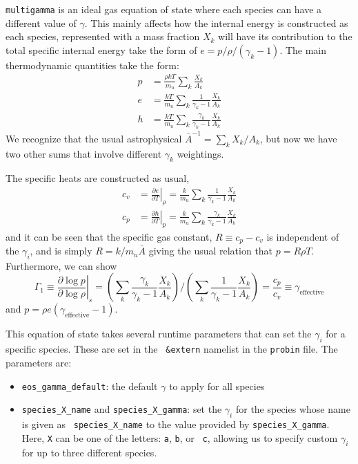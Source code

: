 {\tt multigamma} is an ideal gas equation of state where each
  species can have a different value of $\gamma$.  This mainly affects
  how the internal energy is constructed as each species, represented
  with a mass fraction $X_k$ will have its contribution to the total
  specific internal energy take the form of $e = p/\rho/(\gamma_k -
  1)$.  The main thermodynamic quantities take the form:
\begin{align}
p &= \frac{\rho k T}{m_u} \sum_k \frac{X_k}{A_k} \\
e &= \frac{k T}{m_u} \sum_k \frac{1}{\gamma_k - 1} \frac{X_k}{A_k} \\
h &= \frac{k T}{m_u} \sum_k \frac{\gamma_k}{\gamma_k - 1} \frac{X_k}{A_k}
\end{align}
We recognize that the usual astrophysical $\bar{A}^{-1} = \sum_k
X_k/A_k$, but now we have two other sums that involve different
$\gamma_k$ weightings.

The specific heats are constructed as usual,
\begin{align}
c_v &= \left . \frac{\partial e}{\partial T} \right |_\rho = 
    \frac{k}{m_u} \sum_k \frac{1}{\gamma_k - 1} \frac{X_k}{A_k} \\
c_p &= \left . \frac{\partial h}{\partial T} \right |_p = 
    \frac{k}{m_u} \sum_k \frac{\gamma_k}{\gamma_k - 1} \frac{X_k}{A_k} 
\end{align}
and it can be seen that the specific gas constant, $R \equiv c_p -
c_v$ is independent of the $\gamma_i$, and is simply $R =
k/m_u\bar{A}$ giving the usual relation that $p = R\rho T$.
Furthermore, we can show
\begin{equation}
\Gamma_1 \equiv \left . \frac{\partial \log p}{\partial \log \rho} \right |_s =  
   \left ( \sum_k \frac{\gamma_k}{\gamma_k - 1} \frac{X_k}{A_k} \right ) \bigg /
   \left ( \sum_k \frac{1}{\gamma_k - 1} \frac{X_k}{A_k} \right ) =
\frac{c_p}{c_v} \equiv \gamma_\mathrm{effective} 
\end{equation}
and $p = \rho e (\gamma_\mathrm{effective} - 1)$.

This equation of state takes several runtime parameters that can set
the $\gamma_i$ for a specific species.  These are set in the {\tt
  \&extern} namelist in the {\tt probin} file.  The parameters are:
\begin{itemize}
\item {\tt eos\_gamma\_default}: the default $\gamma$ to apply for all
  species
\item {\tt species\_X\_name} and {\tt species\_X\_gamma}: set the
  $\gamma_i$ for the species whose name is given as {\tt
  species\_X\_name} to the value provided by {\tt species\_X\_gamma}.
  Here, {\tt X} can be one of the letters: {\tt a}, {\tt b}, or {\tt
    c}, allowing us to specify custom $\gamma_i$ for up to three
  different species.
\end{itemize}

